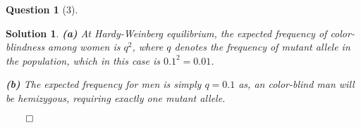\documentclass{article} %
\theoremstyle{quest}
\newtheorem*{question}{Question}
\newtheorem*{solution}{Solution}
\begin{document}
\bigskip

\begin{question}[3]
\end{question}
\begin{solution}
\textbf{(a)} At Hardy-Weinberg equilibrium, the expected frequency 
of color-blindness among women is $q^2$, where $q$ denotes the frequency
of mutant allele in the population, which in this case is $0.1^2 = 0.01$.

\smallskip

\textbf{(b)} The expected frequency for men is simply $q = 0.1$ as, 
an color-blind man will be hemizygous, requiring exactly one mutant allele.

\hfill $\qed$

 
\end{solution}


\bigskip
\end{document}

